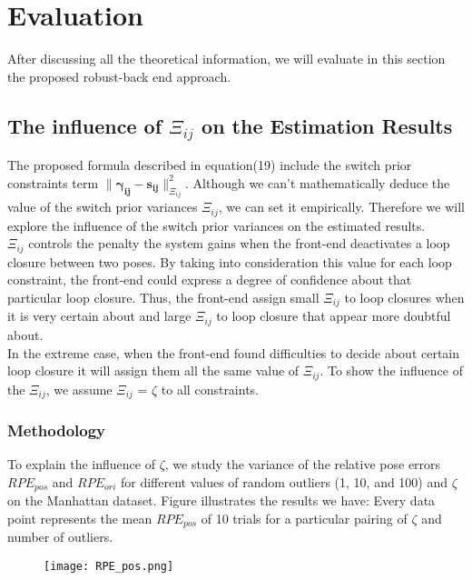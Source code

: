 \documentclass[9pt,technote]{IEEEtran}
\begin{document}
\section{Evaluation}
After discussing all the theoretical information,
we will evaluate in this section the proposed robust-back end approach.
\subsection{The influence of $\Xi_{ij}$ on the Estimation Results}
The proposed formula described in equation(19) include the switch prior constraints term $\lVert \mathbf{\gamma_{ij} - s_{ij}}\rVert _{\Xi_{ij}} ^{2}$. Although we can't mathematically deduce the value of the switch prior variances $\Xi_{ij}$, we can set it empirically. 
Therefore we will explore the influence of the switch prior variances on the estimated results. \\
$\Xi_{ij}$ controls the penalty the system gains when the front-end deactivates a loop closure between two poses.
By taking into consideration this value for each loop constraint, the front-end could express a degree of confidence about that particular loop closure. Thus, the front-end assign small $\Xi_{ij}$ to loop closures when it is very certain about and large $\Xi_{ij}$ to loop closure that appear more doubtful about.\\
In the extreme case, when the front-end found difficulties  to decide about certain loop closure it will assign them all the same value of $\Xi_{ij}$.
To show the influence of the $\Xi_{ij}$, we assume $\Xi_{ij}$ = $\zeta$ to all constraints.\\
\subsubsection{Methodology} To explain the influence of $\zeta$, we study the variance of the relative pose errors $RPE_{pos}$ and $RPE_{ori}$ for different values of random outliers (1, 10, and 100) and  $\zeta$ on the Manhattan dataset. Figure illustrates the results we have:
Every data point represents the mean $RPE_{pos}$  of 10 trials for a particular pairing of $\zeta$ and number of outliers. 
\begin{figure}
[h!]
\centering
\texttt{[image: RPE\_pos.png]}
\end{figure}
\end{document}
